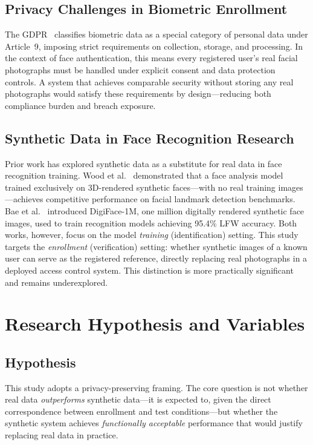 \documentclass[conference]{IEEEtran}
\begin{document}
\subsection{Privacy Challenges in Biometric Enrollment}

The GDPR~\cite{gdpr} classifies biometric data as a special
category of personal data under Article~9, imposing strict
requirements on collection, storage, and processing. In the
context of face authentication, this means every registered
user's real facial photographs must be handled under explicit
consent and data protection controls. A system that achieves
comparable security without storing any real photographs would
satisfy these requirements by design---reducing both
compliance burden and breach exposure.

\subsection{Synthetic Data in Face Recognition Research}

Prior work has explored synthetic data as a substitute for
real data in face recognition training. Wood et
al.~\cite{wood2021} demonstrated that a face analysis model
trained exclusively on 3D-rendered synthetic faces---with no
real training images---achieves competitive performance on
facial landmark detection benchmarks. Bae et al.~\cite{bae2023}
introduced DigiFace-1M, one million digitally rendered
synthetic face images, used to train recognition models
achieving 95.4\% LFW accuracy. Both works, however, focus on
the model \textit{training} (identification) setting. This
study targets the \textit{enrollment} (verification) setting:
whether synthetic images of a known user can serve as the
registered reference, directly replacing real photographs in a
deployed access control system. This distinction is more
practically significant and remains underexplored.

\section{Research Hypothesis and Variables}

\subsection{Hypothesis}

This study adopts a privacy-preserving framing. The core
question is not whether real data \textit{outperforms}
synthetic data---it is expected to, given the direct
correspondence between enrollment and test conditions---but
whether the synthetic system achieves \textit{functionally
acceptable} performance that would justify replacing real
data in practice.
\end{document}
